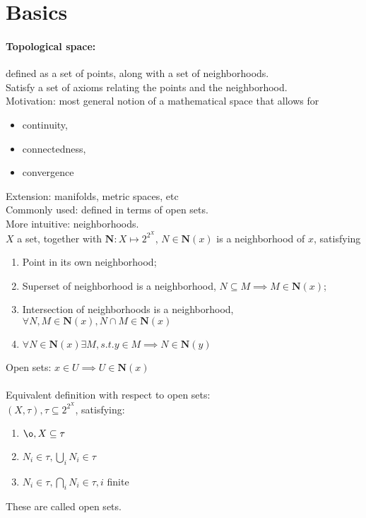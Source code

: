 \documentclass[10pt,a4paper]{report}
\begin{document}
\section{Basics}
\paragraph{Topological space:} defined as a set of points, along with a set of neighborhoods.\\
Satisfy a set of axioms relating the points and the neighborhood.\\
Motivation: most general notion of a mathematical space that allows for \\
\begin{itemize}
	\item continuity, 
	\item connectedness,
	\item convergence
\end{itemize}
Extension: manifolds, metric spaces, etc\\
Commonly used: defined in terms of open sets.\\
More intuitive: neighborhoods.\\

$X$ a set, together with $\mathbf{N}:X\mapsto 2^{2^{X}}$, $N\in\mathbf{N}(x)$ is a neighborhood of $x$, satisfying
\begin{enumerate}
	\item Point in its own neighborhood;
	\item Superset of neighborhood is a neighborhood, $N\subseteq M\implies M\in\mathbf{N}(x)$;
	\item Intersection of neighborhoods is a neighborhood, $\forall N,M\in\mathbf{N}(x),N\cap M\in				  \mathbf{N}(x)$
	\item $\forall N\in\mathbf{N}(x)\exists M,s.t. y\in M\implies N\in\mathbf{N}(y)$
\end{enumerate}

Open sets: $x\in U\implies U\in\mathbf{N}(x)$\\
\\
Equivalent definition with respect to open sets:\\
$(X,\tau),\tau\subseteq 2^{2^{X}}$, satisfying:
\begin{enumerate}
	\item $\o,X\subseteq \tau$
	\item $N_{i}\in\tau,\bigcup_{i}N_{i}\in\tau$
	\item $N_{i}\in\tau,\bigcap_{i}N_{i}\in\tau,i$ finite
\end{enumerate}
These are called open sets.\\
\\
\end{document}
